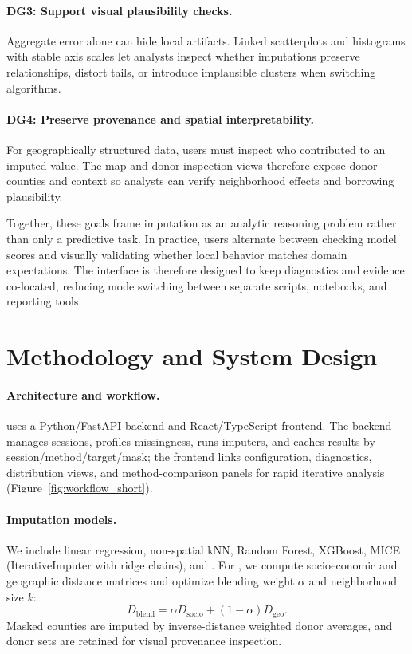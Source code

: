 \paragraph*{DG3: Support visual plausibility checks.}
Aggregate error alone can hide local artifacts. Linked scatterplots and histograms with stable axis scales let analysts inspect whether imputations preserve relationships, distort tails, or introduce implausible clusters when switching algorithms.

\paragraph*{DG4: Preserve provenance and spatial interpretability.}
For geographically structured data, users must inspect who contributed to an imputed value. The map and donor inspection views therefore expose donor counties and context so analysts can verify neighborhood effects and borrowing plausibility.

Together, these goals frame imputation as an analytic reasoning problem rather than only a predictive task. In practice, users alternate between checking model scores and visually validating whether local behavior matches domain expectations. The interface is therefore designed to keep diagnostics and evidence co-located, reducing mode switching between separate scripts, notebooks, and reporting tools.

\section{Methodology and System Design}
\paragraph*{Architecture and workflow.}
\tool uses a Python/FastAPI backend and React/TypeScript frontend. The backend manages sessions, profiles missingness, runs imputers, and caches results by session/method/target/mask; the frontend links configuration, diagnostics, distribution views, and method-comparison panels for rapid iterative analysis (Figure~\ref{fig:workflow_short}).

\paragraph*{Imputation models.}
We include linear regression, non-spatial kNN, Random Forest, XGBoost, MICE (IterativeImputer with ridge chains), and \gknn. For \gknn, we compute socioeconomic and geographic distance matrices and optimize blending weight \(\alpha\) and neighborhood size \(k\):
\begin{equation}
  D_{\text{blend}}=\alpha D_{\text{socio}}+(1-\alpha)D_{\text{geo}}.
\end{equation}
Masked counties are imputed by inverse-distance weighted donor averages, and donor sets are retained for visual provenance inspection.


